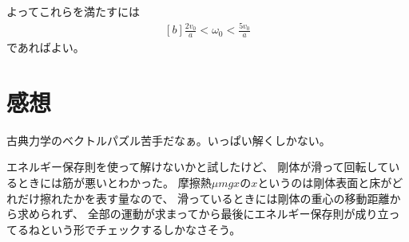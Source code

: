 \documentclass[../ap_2013.tex]{subfiles}
\begin{document}
よってこれらを満たすには
\begin{equation}\begin{aligned}[b]
    \frac{2v_0}{a} < \omega_0 < \frac{5v_0}{a}
\end{aligned}\end{equation}
であればよい。


\section*{感想}
古典力学のベクトルパズル苦手だなぁ。いっぱい解くしかない。

エネルギー保存則を使って解けないかと試したけど、
剛体が滑って回転しているときには筋が悪いとわかった。
摩擦熱\(\mu mg x\)の\(x\)というのは剛体表面と床がどれだけ擦れたかを表す量なので、
滑っているときには剛体の重心の移動距離から求められず、
全部の運動が求まってから最後にエネルギー保存則が成り立ってるねという形でチェックするしかなさそう。
\end{document}
